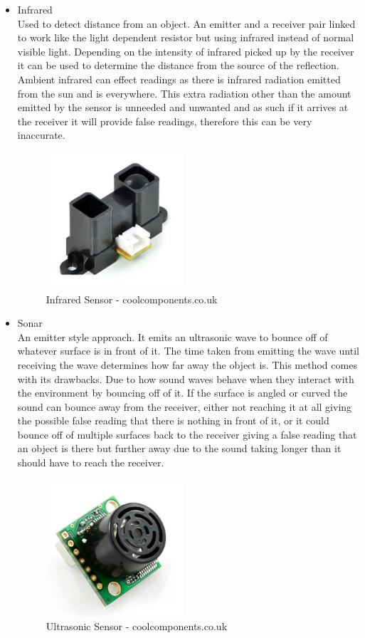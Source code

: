 \begin{itemize}
\item Infrared
\\Used to detect distance from an object.  An emitter and a receiver pair linked to work like the light dependent resistor but using infrared instead of normal visible light.  Depending on the intensity of infrared picked up by the receiver it can be used to determine the distance from the source of the reflection.  Ambient infrared can effect readings as there is infrared radiation emitted from the sun and is everywhere.  This extra radiation other than the amount emitted by the sensor is unneeded and unwanted and as such if it arrives at the receiver it will provide false readings, therefore this can be very inaccurate.
\begin{figure}[H]
\centering
        \includegraphics[width=2.0in] {Images/ir.jpg}
        \caption{Infrared Sensor - coolcomponents.co.uk}
        \label{Infrared Sensor}
\end{figure}

\item Sonar
\\An emitter style approach.  It emits an ultrasonic wave to bounce off of whatever surface is in front of it.  The time taken from emitting the wave until receiving the wave determines how far away the object is.  This method comes with its drawbacks.  Due to how sound waves behave when they interact with the environment by bouncing off of it.  If the surface is angled or curved the sound can bounce away from the receiver, either not reaching it at all giving the possible false reading that there is nothing in front of it, or it could bounce off of multiple surfaces back to the receiver giving a false reading that an object is there but further away due to the sound taking longer than it should have to reach the receiver.
\begin{figure}[H]
\centering
        \includegraphics[width=2.0in] {Images/sonar.jpg}
        \caption{Ultrasonic Sensor - coolcomponents.co.uk}
        \label{Ultrasonic Sensor}
\end{figure}

\end{itemize}
